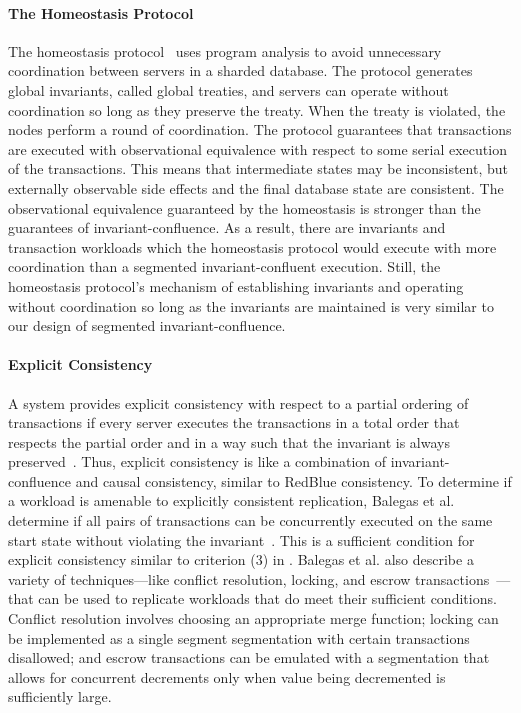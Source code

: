 \paragraph{The Homeostasis Protocol}
The homeostasis protocol~\cite{roy2015homeostasis} uses program analysis to
avoid unnecessary coordination between servers in a sharded database. The
protocol generates global invariants, called global treaties, and servers can
operate without coordination so long as they preserve the treaty. When the
treaty is violated, the nodes perform a round of coordination. The protocol
guarantees that transactions are executed with observational equivalence with
respect to some serial execution of the transactions. This means that
intermediate states may be inconsistent, but externally observable side effects
and the final database state are consistent. The observational equivalence
guaranteed by the homeostasis is stronger than the guarantees of
invariant-confluence. As a result, there are invariants and transaction
workloads which the homeostasis protocol would execute with more coordination
than a segmented invariant-confluent execution. Still, the homeostasis
protocol's mechanism of establishing invariants and operating without
coordination so long as the invariants are maintained is very similar to our
design of segmented invariant-confluence.

\paragraph{Explicit Consistency}
A system provides explicit consistency with respect to a partial ordering of
transactions if every server executes the transactions in a total order that
respects the partial order and in a way such that the invariant is always
preserved~\cite{balegas2015towards}. Thus, explicit consistency is like a
combination of invariant-confluence and causal consistency, similar to RedBlue
consistency. To determine if a workload is amenable to explicitly consistent
replication, Balegas et al. determine if all pairs of transactions can be
concurrently executed on the same start state without violating the invariant~\cite{balegas2015towards}.
This is a sufficient condition for explicit consistency similar to criterion
(3) in . Balegas et al. also describe a variety of
techniques---like conflict resolution, locking, and escrow
transactions~\cite{o1986escrow}---that can be used to replicate workloads that
do meet their sufficient conditions. Conflict resolution involves choosing an
appropriate merge function; locking can be implemented as a single segment
segmentation with certain transactions disallowed; and escrow transactions can
be emulated with a segmentation that allows for concurrent decrements only when
value being decremented is sufficiently large.


